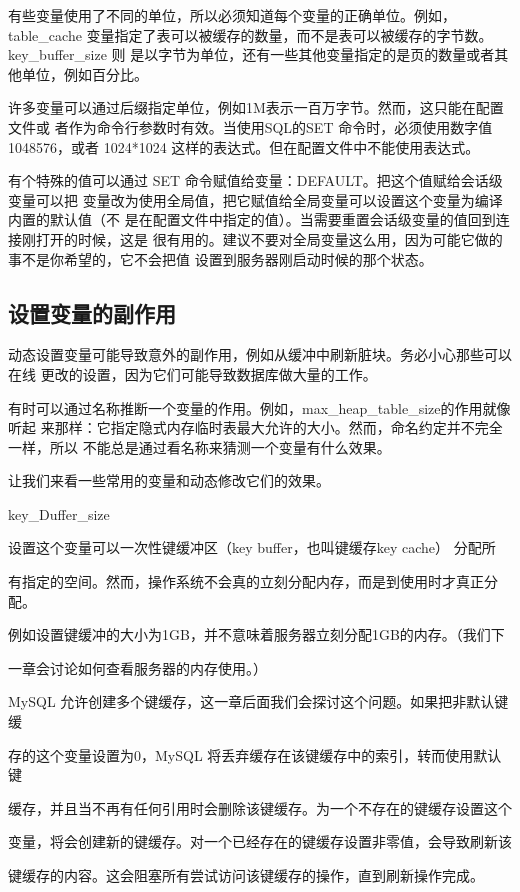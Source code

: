 有些变量使用了不同的单位，所以必须知道每个变量的正确单位。例如，table\_cache
变量指定了表可以被缓存的数量，而不是表可以被缓存的字节数。key\_buffer\_size 则
是以字节为单位，还有一些其他变量指定的是页的数量或者其他单位，例如百分比。

许多变量可以通过后缀指定单位，例如1M表示一百万字节。然而，这只能在配置文件或
者作为命令行参数时有效。当使用SQL的SET 命令时，必须使用数字值1048576，或者
1024*1024 这样的表达式。但在配置文件中不能使用表达式。

有个特殊的值可以通过 SET 命令赋值给变量：DEFAULT。把这个值赋给会话级变量可以把
变量改为使用全局值，把它赋值给全局变量可以设置这个变量为编译内置的默认值（不
是在配置文件中指定的值）。当需要重置会话级变量的值回到连接刚打开的时候，这是
很有用的。建议不要对全局变量这么用，因为可能它做的事不是你希望的，它不会把值
设置到服务器刚启动时候的那个状态。

\subsection{设置变量的副作用}
动态设置变量可能导致意外的副作用，例如从缓冲中刷新脏块。务必小心那些可以在线
更改的设置，因为它们可能导致数据库做大量的工作。

有时可以通过名称推断一个变量的作用。例如，max\_heap\_table\_size的作用就像听起
来那样：它指定隐式内存临时表最大允许的大小。然而，命名约定并不完全一样，所以
不能总是通过看名称来猜测一个变量有什么效果。

让我们来看一些常用的变量和动态修改它们的效果。

key\_Duffer\_size

设置这个变量可以一次性键缓冲区（key buffer，也叫键缓存key cache） 分配所

有指定的空间。然而，操作系统不会真的立刻分配内存，而是到使用时才真正分配。

例如设置键缓冲的大小为1GB，并不意味着服务器立刻分配1GB的内存。（我们下

一章会讨论如何查看服务器的内存使用。）

MySQL 允许创建多个键缓存，这一章后面我们会探讨这个问题。如果把非默认键缓

存的这个变量设置为0，MySQL 将丢弃缓存在该键缓存中的索引，转而使用默认键

缓存，并且当不再有任何引用时会删除该键缓存。为一个不存在的键缓存设置这个

变量，将会创建新的键缓存。对一个已经存在的键缓存设置非零值，会导致刷新该

键缓存的内容。这会阻塞所有尝试访问该键缓存的操作，直到刷新操作完成。

